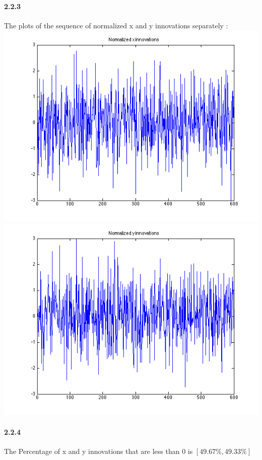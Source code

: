 \documentclass[a4paper]{article}
\begin{document}
\paragraph{2.2.3 } The plots of the sequence of normalized x and y innovations separately : \\
\includegraphics[scale=.4]{target_2_x_inno_q_0_1.png}
\includegraphics[scale=.4]{target_2_y_inno_q_0_1.png} \\

\paragraph{2.2.4 } The Percentage of x and y innovations that are less than 0 is $[ 49.67\%, 49.33\% ]$ \\
\end{document}
